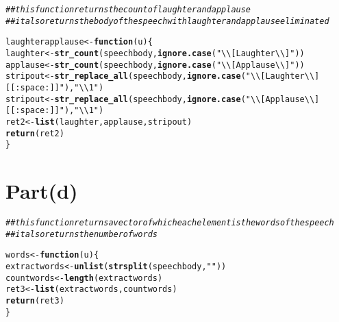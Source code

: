 \documentclass[english]{article}\usepackage[]{graphicx}\usepackage[]{color}
\makeatletter
\newcommand{\hlstr}[1]{\textcolor[rgb]{0.192,0.494,0.8}{#1}}%
\newcommand{\hlcom}[1]{\textcolor[rgb]{0.678,0.584,0.686}{\textit{#1}}}%
\newcommand{\hlstd}[1]{\textcolor[rgb]{0.345,0.345,0.345}{#1}}%
\newcommand{\hlkwa}[1]{\textcolor[rgb]{0.161,0.373,0.58}{\textbf{#1}}}%
\newcommand{\hlkwb}[1]{\textcolor[rgb]{0.69,0.353,0.396}{#1}}%
\newcommand{\hlkwc}[1]{\textcolor[rgb]{0.333,0.667,0.333}{#1}}%
\newcommand{\hlkwd}[1]{\textcolor[rgb]{0.737,0.353,0.396}{\textbf{#1}}}%
\newenvironment{kframe}{%
 \def\at@end@of@kframe{}%
 \ifinner\ifhmode%
  \def\at@end@of@kframe{\end{minipage}}%
  \begin{minipage}{\columnwidth}%
 \fi\fi%
 \def\FrameCommand##1{\hskip\@totalleftmargin \hskip-\fboxsep
 \colorbox{shadecolor}{##1}\hskip-\fboxsep
     \hskip-\linewidth \hskip-\@totalleftmargin \hskip\columnwidth}%
 \MakeFramed {\advance\hsize-\width
   \@totalleftmargin\z@ \linewidth\hsize
   \@setminipage}}%
 {\par\unskip\endMakeFramed%
 \at@end@of@kframe}
\newenvironment{knitrout}{}{} %
\makeatother
\begin{document}
\begin{knitrout}
\color{fgcolor}\begin{kframe}
\begin{alltt}
\hlcom{## this function returns the count of laughter and applause}
\hlcom{## it also returns the body of the speech with laughter and applause eliminated}

\hlstd{laughterapplause} \hlkwb{<-} \hlkwa{function}\hlstd{(}\hlkwc{u}\hlstd{)\{}
        \hlstd{laughter} \hlkwb{<-} \hlkwd{str_count}\hlstd{(speechbody,}\hlkwd{ignore.case}\hlstd{(}\hlstr{"\textbackslash{}\textbackslash{}[Laughter\textbackslash{}\textbackslash{}]"}\hlstd{))}
        \hlstd{applause} \hlkwb{<-} \hlkwd{str_count}\hlstd{(speechbody,}\hlkwd{ignore.case}\hlstd{(}\hlstr{"\textbackslash{}\textbackslash{}[Applause\textbackslash{}\textbackslash{}]"}\hlstd{))}
        \hlstd{stripout} \hlkwb{<-} \hlkwd{str_replace_all}\hlstd{(speechbody,}\hlkwd{ignore.case}\hlstd{(}\hlstr{"\textbackslash{}\textbackslash{}[Laughter\textbackslash{}\textbackslash{}][[:space:]]"}\hlstd{),}\hlstr{"\textbackslash{}\textbackslash{}1"}\hlstd{)}
        \hlstd{stripout} \hlkwb{<-} \hlkwd{str_replace_all}\hlstd{(speechbody,}\hlkwd{ignore.case}\hlstd{(}\hlstr{"\textbackslash{}\textbackslash{}[Applause\textbackslash{}\textbackslash{}][[:space:]]"}\hlstd{),}\hlstr{"\textbackslash{}\textbackslash{}1"}\hlstd{)}
        \hlstd{ret2} \hlkwb{<-} \hlkwd{list}\hlstd{(laughter,applause, stripout)}
        \hlkwd{return}\hlstd{(ret2)}
\hlstd{\}}
\end{alltt}
\end{kframe}
\end{knitrout}


\section*{Part(d)}

\begin{knitrout}
\color{fgcolor}\begin{kframe}
\begin{alltt}
\hlcom{## this function returns a vector of which each element is the words of the speech}
\hlcom{## it also returns the number of words}

\hlstd{words} \hlkwb{<-} \hlkwa{function}\hlstd{(}\hlkwc{u}\hlstd{)\{}
        \hlstd{extractwords} \hlkwb{<-} \hlkwd{unlist}\hlstd{(}\hlkwd{strsplit}\hlstd{(speechbody,}\hlstr{" "}\hlstd{))}
        \hlstd{countwords} \hlkwb{<-} \hlkwd{length}\hlstd{(extractwords)}
        \hlstd{ret3} \hlkwb{<-} \hlkwd{list}\hlstd{(extractwords, countwords)}
        \hlkwd{return}\hlstd{(ret3)}
\hlstd{\}}
\end{alltt}
\end{kframe}
\end{knitrout}
\end{document}
